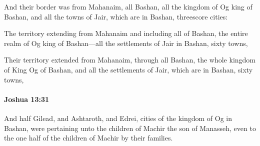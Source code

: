 			\begin{versebox}
					\item[BHS] 
					\item[ASV] And their border was from Mahanaim, all Bashan, all the kingdom of Og king of Bashan, and all the towns of Jair, which are in Bashan, threescore cities:
					\item[NIV] The territory extending from Mahanaim and including all of Bashan, the entire realm of Og king of Bashan—all the settlements of Jair in Bashan, sixty towns,
					\item[NRSV] Their territory extended from Mahanaim, through all Bashan, the whole kingdom of King Og of Bashan, and all the settlements of Jair, which are in Bashan, sixty towns,
			\end{versebox}

		\paragraph{Joshua 13:31} %
			\label{JOSHUA-13-31}

			And half Gilead, and Ashtaroth, and Edrei, cities of the kingdom of Og in Bashan, were pertaining unto the children of Machir the son of Manasseh, even to the one half of the children of Machir by their families.

